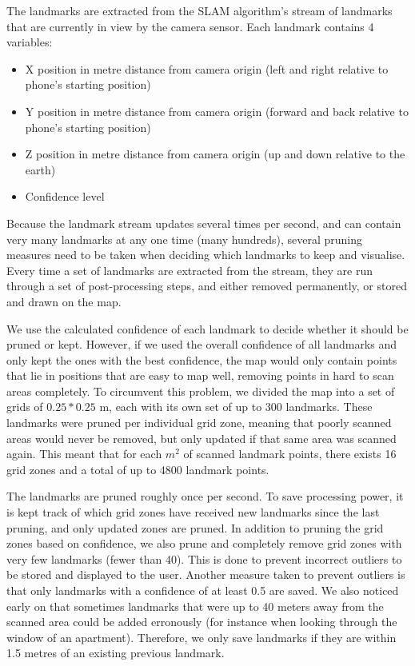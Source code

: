 \documentclass{article}
\begin{document}
The landmarks are extracted from the SLAM algorithm's stream of landmarks that are currently in view by the camera sensor. Each landmark contains 4 variables:
\begin{itemize}
    \item X position in metre distance from camera origin (left and right relative to phone's starting position)
    \item Y position in metre distance from camera origin (forward and back relative to phone's starting position)
    \item Z position in metre distance from camera origin (up and down relative to the earth)
    \item Confidence level
\end{itemize}
Because the landmark stream updates several times per second, and can contain very many landmarks at any one time (many hundreds), several pruning measures need to be taken when deciding which landmarks to keep and visualise. Every time a set of landmarks are extracted from the stream, they are run through a set of post-processing steps, and either removed permanently, or stored and drawn on the map.

We use the calculated confidence of each landmark to decide whether it should be pruned or kept. However, if we used the overall confidence of all landmarks and only kept the ones with the best confidence, the map would only contain points that lie in positions that are easy to map well, removing points in hard to scan areas completely. To circumvent this problem, we divided the map into a set of grids of $0.25 * 0.25$ m, each with its own set of up to 300 landmarks. These landmarks were pruned per individual grid zone, meaning that poorly scanned areas would never be removed, but only updated if that same area was scanned again. This meant that for each $m^2$ of scanned landmark points, there exists 16 grid zones and a total of up to 4800 landmark points.

The landmarks are pruned roughly once per second. To save processing power, it is kept track of which grid zones have received new landmarks since the last pruning, and only updated zones are pruned. In addition to pruning the grid zones based on confidence, we also prune and completely remove grid zones with very few landmarks (fewer than 40). This is done to prevent incorrect outliers to be stored and displayed to the user. Another measure taken to prevent outliers is that only landmarks with a confidence of at least 0.5 are saved. We also noticed early on that sometimes landmarks that were up to 40 meters away from the scanned area could be added erronously (for instance when looking through the window of an apartment). Therefore, we only save landmarks if they are within 1.5 metres of an existing previous landmark.
\end{document}
